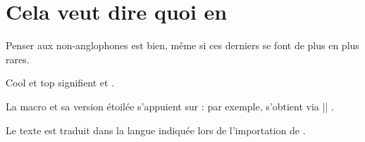 \documentclass[10pt, a4paper]{article}
\begin{document}
\section{Cela veut dire quoi en }

Penser aux non-anglophones est bien, même si ces derniers se font de plus en plus rares.

\begin{tdoclatex}
Cool et top signifient  et .
\end{tdoclatex}


La macro  et sa version étoilée s'appuient sur  : par exemple,  s'obtient via \tdocinlatex|| .


\begin{tdocnote}
	Le texte  est traduit dans la langue indiquée lors de l'importation de .
\end{tdocnote}
\end{document}

